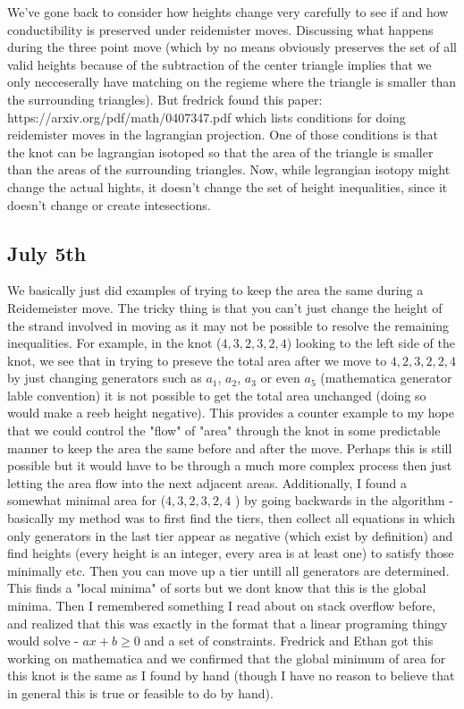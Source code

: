 \documentclass[11pt,oneside]{amsart}
\begin{document}
We've gone back to consider how heights change very carefully to see if and how conductibility is preserved under reidemister moves. Discussing what happens during the three point move (which by no means obviously preserves the set of all valid heights because of the subtraction of the center triangle implies that we only necceserally have matching on the regieme where the triangle is smaller than the surrounding triangles). But fredrick found this paper: https://arxiv.org/pdf/math/0407347.pdf which lists conditions for doing reidemister moves in the lagrangian projection. One of those conditions is that the knot can be lagrangian isotoped so that the area of the triangle is smaller than the areas of the surrounding triangles. Now, while legrangian isotopy might change the actual hights, it doesn't change the set of height inequalities, since it doesn't change or create intesections. 



\subsection{July 5th}


We basically just did examples of trying to keep the area the same during a Reidemeister move. The tricky thing is that you can't just change the height of the strand involved in moving as it may not be possible to resolve the remaining inequalities. For example, in the knot ($4, 3, 2, 3, 2, 4$) looking to the left side of the knot, we see that in trying to preseve the total area after we move to $4,2,3,2,2,4$ by just changing generators such as $a_1$, $a_2$, $a_3$ or even $a_5$ (mathematica generator lable convention) it is not possible to get the total area unchanged (doing so would make a reeb height negative). This provides a counter example to my hope that we could control the "flow" of "area" through the knot in some predictable manner to keep the area the same before and after the move. Perhaps this is still possible but it would have to be through a much more complex process then just letting the area flow into the next adjacent areas. Additionally, I found a somewhat minimal area for ($4, 3, 2, 3, 2, 4$ ) by going backwards in the algorithm - basically my method was to first find the tiers, then collect all equations in which only generators in the last tier appear as negative (which exist by definition) and find heights (every height is an integer, every area is at least one) to satisfy those minimally etc. Then you can move up a tier untill all generators are determined. This finds a "local minima" of sorts but we dont know that this is the global minima. Then I remembered something I read about on stack overflow before, and realized that this was exactly in the format that a linear programing thingy would solve  - $ax + b \ge 0 $ and a set of constraints. Fredrick and Ethan got this working on mathematica and we confirmed that the global minimum of area for this knot is the same as I found by hand (though I have no reason to believe that in general this is true or feasible to do by hand). 
\end{document}

